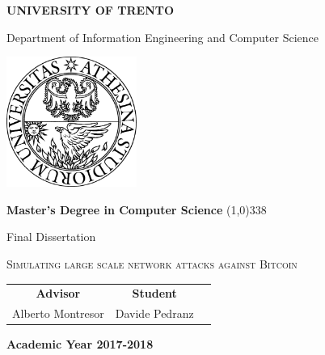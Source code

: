 \begin{titlepage}

	\pagestyle{empty}

	\vspace*{\fill}

	\begin{center}

		\vspace{-0.2cm}
		{
			\bfseries
			\Large {\huge U}NIVERSITY OF {\huge T}RENTO
		}

		\vspace{0.3cm}
		{\Large Department of Information Engineering and Computer Science}

		\vspace{0.6cm}
		\begin{center}
			\includegraphics[width=0.32\textwidth]{figures/unitn}
		\end{center}
		\vspace{0.6cm}

		{
			\bfseries
			\Large Master's Degree in Computer Science
		}
		\vspace{0.3cm}
		\line(1,0){338}
		\vspace{0.3cm}

		{
			\Large Final Dissertation
		}

		\vspace{2cm}
		{
			\begin{spacing}{0.9}
				\huge \textsc{Simulating large scale network attacks against Bitcoin}
			\end{spacing}
		}
		\vspace{2cm}

		\Large
		\begin{center}
			\begin{tabular}{ccc}
				{\bfseries Advisor} & \hspace{5cm} {\bfseries Student} \\
				Alberto Montresor   & \hspace{5cm} Davide Pedranz      \\
			\end{tabular}
		\end{center}

		\vspace{3cm}
		{
			\bfseries
			\large Academic Year 2017-2018
		}

	\end{center}

	\vfill

\end{titlepage}
